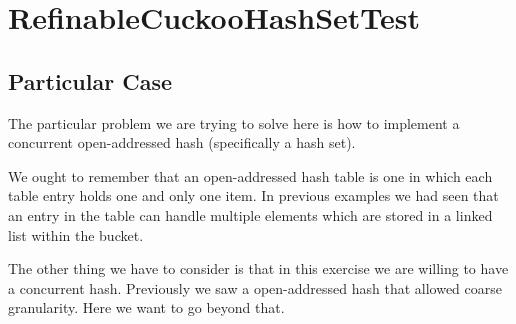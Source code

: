 \section{\textbf{RefinableCuckooHashSetTest}}
\subsection{Particular Case}
\par
The particular problem we are trying to solve here is how to implement a
concurrent open-addressed hash (specifically a hash set).
\par
We ought to remember that an open-addressed hash table is one in which each
table entry holds one and only one item. In previous examples we had seen that
an entry in the table can handle multiple elements which are stored in a linked
list within the bucket.
\par
The other thing we have to consider is that in this exercise we are willing to
have a concurrent hash. Previously we saw a open-addressed hash that allowed
coarse granularity. Here we want to go beyond that.
\par
